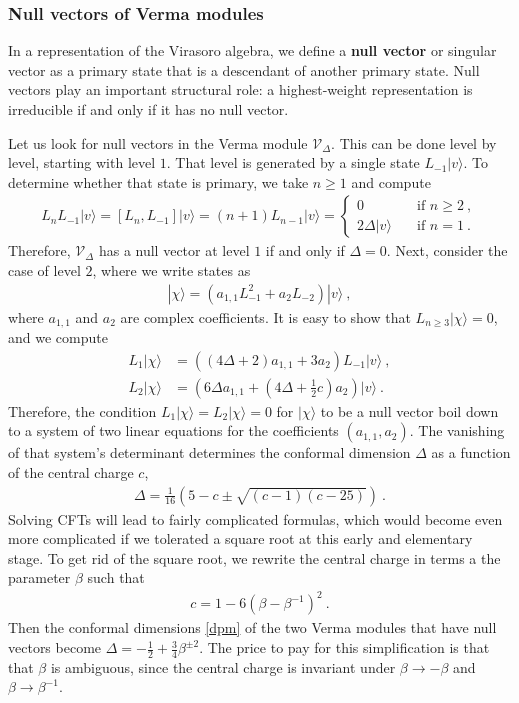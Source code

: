 \documentclass[12pt, a4paper]{article}
\theoremstyle{break}
\begin{document}
\subsubsection{Null vectors of Verma modules}

In a representation of the Virasoro algebra, we define a \textbf{null vector} or singular vector as a primary state that is a descendant of another primary state. Null vectors play an important structural role: a highest-weight representation is irreducible if and only if it has no null vector. 

Let us look for null vectors in the Verma module $\mathcal{V}_\Delta$. This can be done level by level, starting with level $1$. That level is generated by a single state $L_{-1}|v\rangle$. To determine whether that state is primary, we take $n\geq 1$ and compute 
\begin{align}
L_n L_{-1}|v\rangle = [L_n, L_{-1}] |v\rangle = (n+1) L_{n-1}|v\rangle = 
\left\{\begin{array}{ll} 0 &  \quad \text{if } n\geq 2\ , \\ 2\Delta |v\rangle & \quad \text{if } n = 1\ . \end{array}\right. 
\end{align}
Therefore, $\mathcal{V}_\Delta$ has a null vector at level $1$ if and only if $\Delta=0$. Next, consider the case of level $2$, where we write states as 
\begin{align}
 |\chi\rangle = \left(a_{1,1} L_{-1}^2 + a_2 L_{-2}\right) |v\rangle\ ,
\end{align}
where $a_{1,1}$ and $a_2$ are complex coefficients. It is easy to show that $L_{n\geq 3}|\chi\rangle=0$, and we compute 
\begin{align}
 L_1|\chi\rangle &= \left((4\Delta+2)a_{1,1} + 3a_2\right) L_{-1}|v\rangle\ ,
\\
L_2 |\chi \rangle &= \left(6\Delta a_{1,1}+(4\Delta+\tfrac12 c) a_2\right)|v\rangle\ .
\end{align}
Therefore, the condition $L_1|\chi\rangle=L_2 |\chi \rangle=0$ for $|\chi\rangle$ to be a null vector boil down to a system of two linear equations for the coefficients $(a_{1,1},a_2)$. The vanishing of that system's determinant determines the conformal dimension $\Delta$ as a function of the central charge $c$,
\begin{align}
 \Delta = \frac{1}{16}\left( 5-c\pm\sqrt{(c-1)(c-25)} \right) \ .
 \label{dpm}
\end{align}
Solving CFTs will lead to fairly complicated formulas, which would become even more complicated if we tolerated a square root at this early and elementary stage.
To get rid of the square root, we rewrite the central charge in terms a the parameter $\beta$ such that 
\begin{align}
 \boxed{c = 1- 6\left(\beta - \beta^{-1}\right)^2 } \ .
\end{align}
Then the conformal dimensions \eqref{dpm} of the two Verma modules that have null vectors become 
$
 \Delta = -\frac12 + \frac34\beta^{\pm 2}
$. The price to pay for this simplification is that that $\beta$ is ambiguous, since the central charge is invariant under $\beta \to -\beta$ and $\beta \to \beta^{-1}$. 
\end{document}
